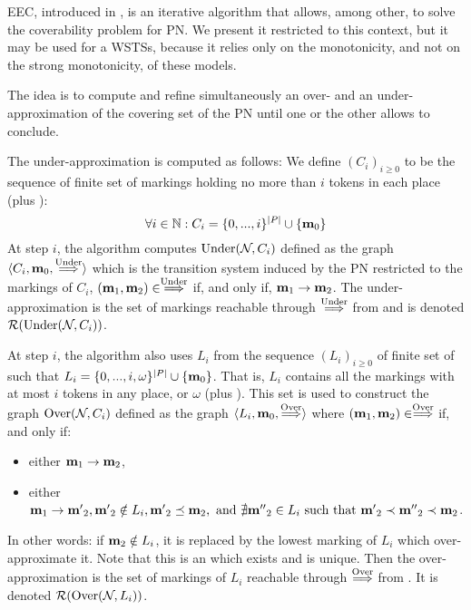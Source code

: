 
\ac{EEC}, introduced in \cite{Geeraerts07thesis, Geeraerts06}, is an iterative algorithm that allows, among other, to solve the coverability problem for \ac{PN}.
We present it restricted to this context, but it may be used for a \acp{WSTS},  because it relies only on the monotonicity, and not on the strong monotonicity, of these models.

The idea is to compute and refine simultaneously an over- and an under-approximation of the covering set of the \ac{PN} until one or the other allows to conclude.

The under-approximation is computed as follows:
We define $(C_i)_{i \geq 0}$ to be the sequence of finite set of markings holding no more than $i$ tokens in each place (plus \mari):
\[
  \forall i \in \mathbb{N} : C_i = \{0, ..., i\}^{\left|P\right|} \cup \{\mathbf{m}_0\}
\]
At step $i$, the algorithm computes $\operatorname{Under}(\mathcal{N}_{}, C_i)$ defined as the graph $\langle C_i, \mathbf{m}_0, \stackrel{\operatorname{Under}}{\Longrightarrow} \rangle$ which is the transition system induced by the \ac{PN} \namePN restricted to the markings of $C_i$, \ie $(\mathbf{m}_1, \mathbf{m}_2) \in \stackrel{\operatorname{Under}}{\Longrightarrow}$ if, and only if, $\mathbf{m}_1 \rightarrow \mathbf{m}_2$.
The under-approximation is the set of markings reachable through $\stackrel{\operatorname{Under}}{\Longrightarrow}$ from \mari and is denoted $\operatorname{\mathcal{R}}(\operatorname{Under}(\mathcal{N}_{}, C_i))$.

At step $i$, the algorithm also uses $L_i$ from the sequence $(L_i)_{i \geq 0}$ of finite set of \omarks such that $L_i = \{0, ..., i, \omega \}^{\left|P\right|} \cup \{\mathbf{m}_0\}$.
That is, $L_i$ contains all the markings with at most $i$ tokens in any place, or $\omega$ (plus \mari).
This set is used to construct the graph $\operatorname{Over}(\mathcal{N}_{}, C_i)$ defined as the graph $\langle L_i, \mathbf{m}_0, \stackrel{\operatorname{Over}}{\Longrightarrow} \rangle$ where $(\mathbf{m}_1, \mathbf{m}_2) \in \stackrel{\operatorname{Over}}{\Longrightarrow}$ if, and only if:
\begin{itemize}
  \item either $\mathbf{m}_1 \rightarrow \mathbf{m}_2$,
  \item either $\mathbf{m}_1 \rightarrow \mathbf{m'}_2, \mathbf{m'}_2 \notin L_i, \mathbf{m'}_2 \preceq \mathbf{m}_2, \text{ and } \nexists \mathbf{m''}_2 \in L_i \text{ such that } \mathbf{m'}_2 \prec \mathbf{m''}_2 \prec \mathbf{m}_2$.
\end{itemize}
In other words: if $\mathbf{m}_2 \notin L_i$, it is replaced by the lowest marking of $L_i$ which over-approximate it.
Note that this is an \omark which exists and is unique. 
Then the over-approximation is the set of markings of $L_i$ reachable through $\stackrel{\operatorname{Over}}{\Longrightarrow}$ from \mari. It is denoted $\operatorname{\mathcal{R}}(\operatorname{Over}(\mathcal{N}_{}, L_i))$.

